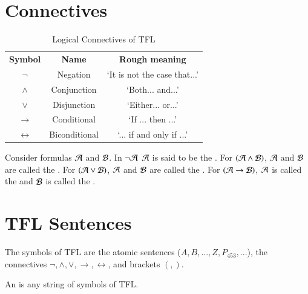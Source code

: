 \documentclass[12pt, a4paper, oneside, openright, titlepage]{book}
\begin{document}
\section{\textsection Connectives}

\begin{table}[H]
    \centering
    \caption{Logical Connectives of TFL}
    \begin{tabular}{ccc}
        \textbf{Symbol} & \textbf{Name} & \textbf{Rough meaning} \\
        $\lnot$ & Negation & `It is not the case that...' \\
        $\wedge$ & Conjunction & `Both... and...'\\
        $\lor$ & Disjunction & `Either... or...' \\
        $\rightarrow$ & Conditional & `If ... then ...' \\
        $\leftrightarrow$ & Biconditional & `... if and only if ...'
    \end{tabular}
\end{table}


\begin{defn}
    Consider formulas $\mathcal{A}$ and $\mathcal{B}$. In $\lnot \mathcal{A}$ $\mathcal{A}$ is said to be the . For $(\mathcal{A} \wedge \mathcal{B})$, $\mathcal{A}$ and $\mathcal{B}$ are called the . For $(\mathcal{A} \lor \mathcal{B})$, $\mathcal{A}$ and $\mathcal{B}$ are called the . For $(\mathcal{A} \rightarrow \mathcal{B})$, $\mathcal{A}$ is called the  and $\mathcal{B}$ is called the .
\end{defn}


\section{\textsection TFL Sentences}

\begin{defn}
    The symbols of TFL are the atomic sentences ($A,B,...,Z,P_{453},...$), the connectives $\lnot,\wedge,\lor,\rightarrow,\leftrightarrow$, and brackets $(,)$.
\end{defn}

\begin{defn}
    An  is any string of symbols of TFL.
\end{defn}
\end{document}
